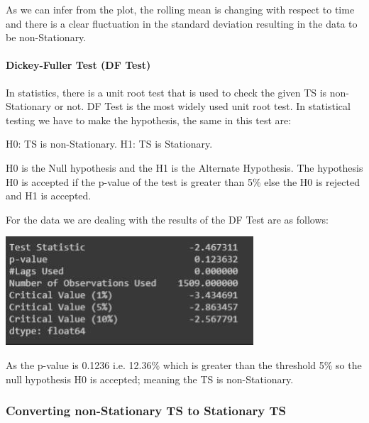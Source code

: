 			As we can infer from the plot, the rolling mean is changing with respect to time and there is a clear fluctuation in the standard deviation resulting in the data to be non-Stationary.

		\paragraph{Dickey-Fuller Test (DF Test)}

		In statistics, there is a unit root test that is used to check the given TS is non-Stationary or not. DF Test is the most widely used unit root test. In statistical testing we have to make the hypothesis, the same in this test are:

H0:	TS is non-Stationary.
H1:	TS is Stationary.

H0 is the Null hypothesis and the H1 is the Alternate Hypothesis. The hypothesis H0 is accepted if the p-value of the test is greater than 5\% else the H0 is rejected and H1 is accepted.

For the data we are dealing with the results of the DF Test are as follows:

		\begin{center}
		\includegraphics[width=\linewidth]{figures/DF-Test-Results-for-moving-average-of-Closing-price.jpg}	
		\label{fig: DF Test Results for moving average of Closing price}
		\end{center}
	
		As the p-value is 0.1236 i.e. 12.36\% which is greater than the threshold 5\% so the null hypothesis H0 is accepted; meaning the TS is non-Stationary.

	\subsubsection{Converting non-Stationary TS to Stationary TS}
	
